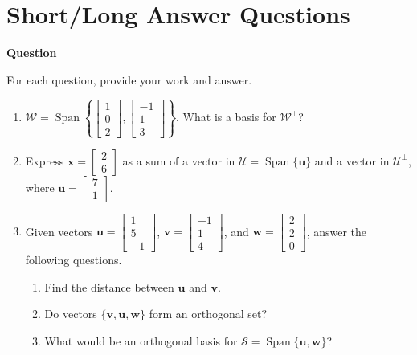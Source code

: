 \documentclass[10pt, titlepage]{article}
\newcounter{question}
\newenvironment{newquestion}
{
	\noindent\textbf{Question \thequestion}
}
{
\stepcounter{question}
\par
}
\renewcommand{\vec}[1]{\bm{#1}}
\DeclareMathOperator{\vspan}{Span}
\begin{document}
\section{\centering Short/Long Answer Questions}
\begin{newquestion}
	For each question, provide your work and answer.
	\begin{enumerate}
		\item \(\mathcal{W} = \vspan \left\{\!\begin{bmatrix}1 \\ 0 \\ 2\end{bmatrix}, \begin{bmatrix}-1 \\ 1 \\ 3\end{bmatrix}\!\right\}\). What is a basis
			for \(\mathcal{W}^\perp\)?
		\item Express \(\vec{x} = \begin{bmatrix}2 \\ 6\end{bmatrix}\) as a sum of a vector in \(\mathcal{U} = \vspan\{\vec{u}\}\) and a vector in 
			\(\mathcal{U}^\perp\), where \(\vec{u} = \begin{bmatrix}7 \\ 1\end{bmatrix}\).
		\item Given vectors \(\vec{u} = \begin{bmatrix}1 \\ 5 \\ -1\end{bmatrix}\), \(\vec{v} = \begin{bmatrix}-1 \\ 1 \\ 4\end{bmatrix}\), and
			\(\vec{w} = \begin{bmatrix}2 \\ 2 \\ 0\end{bmatrix}\), answer the following questions.
				\begin{enumerate}
					\item Find the distance between \(\vec{u}\) and \(\vec{v}\).
					\item Do vectors \(\{\vec{v}, \vec{u}, \vec{w}\}\) form an orthogonal set?
					\item What would be an orthogonal basis for \(\mathcal{S} = \vspan\{\vec{u}, \vec{w}\}\)?
				\end{enumerate}

\end{enumerate}
\end{newquestion}
\end{document}
